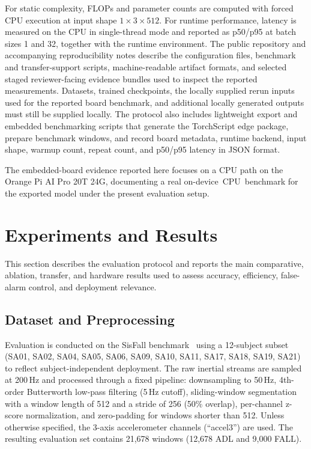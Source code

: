 \documentclass[jec]{acnsart}
\begin{document}
For static complexity, FLOPs and parameter counts are computed with forced CPU execution at input shape $1 \times 3 \times 512$. For runtime performance, latency is measured on the CPU in single-thread mode and reported as p50/p95 at batch sizes 1 and 32, together with the runtime environment. The public repository and accompanying reproducibility notes describe the configuration files, benchmark and transfer-support scripts, machine-readable artifact formats, and selected staged reviewer-facing evidence bundles used to inspect the reported measurements. Datasets, trained checkpoints, the locally supplied rerun inputs used for the reported board benchmark, and additional locally generated outputs must still be supplied locally. The protocol also includes lightweight export and embedded benchmarking scripts that generate the TorchScript edge package, prepare benchmark windows, and record board metadata, runtime backend, input shape, warmup count, repeat count, and p50/p95 latency in JSON format.

The embedded-board evidence reported here focuses on a CPU path on the Orange Pi AI Pro 20T 24G, documenting a real \mbox{on-device CPU benchmark} for the exported model under the present evaluation setup.


\section{Experiments and Results}

This section describes the evaluation protocol and reports the main comparative, ablation, transfer, and hardware results used to assess accuracy, efficiency, false-alarm control, and deployment relevance.

\subsection{Dataset and Preprocessing}

Evaluation is conducted on the SisFall benchmark~\cite{sucerquia2017sisfall} using a 12-subject subset (SA01, SA02, SA04, SA05, SA06, SA09, SA10, SA11, SA17, SA18, SA19, SA21) to reflect subject-independent deployment. The raw inertial streams are sampled at 200\,Hz and processed through a fixed pipeline: downsampling to 50\,Hz, 4th-order Butterworth low-pass filtering (5\,Hz cutoff), sliding-window segmentation with a window length of 512 and a stride of 256 (50\% overlap), per-channel z-score normalization, and zero-padding for windows shorter than 512. Unless otherwise specified, the 3-axis accelerometer channels (``accel3'') are used. The resulting evaluation set contains 21,678 windows (12,678 ADL and 9,000 FALL).
\end{document}
